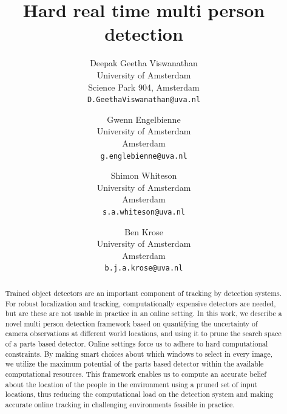 \documentclass[10pt,twocolumn,letterpaper]{article}
\begin{document}
\title{Hard real time multi person detection}
\author{Deepak Geetha Viswanathan\\
University of Amsterdam\\
Science Park 904, Amsterdam\\
{\tt\small D.GeethaViswanathan@uva.nl}
\and
Gwenn Engelbienne\\
University of Amsterdam\\
Amsterdam\\
{\tt\small g.englebienne@uva.nl}
\and
Shimon Whiteson\\
University of Amsterdam\\
Amsterdam\\
{\tt\small s.a.whiteson@uva.nl}
\and
Ben Krose\\
University of Amsterdam\\
Amsterdam\\
{\tt\small b.j.a.krose@uva.nl}
}
\maketitle
\begin{abstract}
Trained object detectors are an important component of tracking by detection systems. For robust localization and tracking, computationally expensive detectors are needed, but are these are not usable in practice in an online setting. In this work, we describe a novel multi person detection framework based on quantifying the uncertainty of camera observations at different world locations, and using it to prune the search space of a parts based detector. Online settings force us to adhere to hard computational constraints. By making smart choices about which windows to select in every image, we utilize the maximum potential of the parts based detector within the available computational resources.
This framework enables us to compute an accurate belief about the location of the people in the environment using a pruned set of input locations, thus reducing the computational load on the detection system and making accurate online tracking in challenging environments feasible in practice.
\end{abstract}
\end{document}
